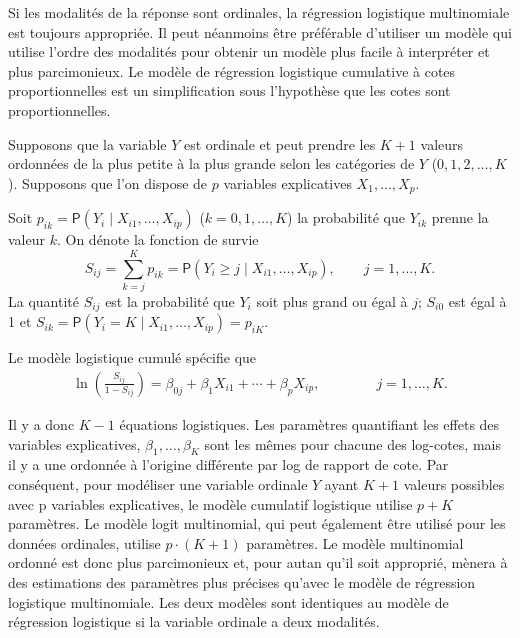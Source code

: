 \documentclass[
  11pt,
  letterpaper,
]{book}
\theoremstyle{definition}
\theoremstyle{definition}
\theoremstyle{definition}
\theoremstyle{remark}
\begin{document}
Si les modalités de la réponse sont ordinales, la régression logistique multinomiale est toujours appropriée. Il peut néanmoins être préférable d'utiliser un modèle qui utilise l'ordre des modalités pour obtenir un modèle plus facile à interpréter et plus parcimonieux. Le modèle de régression logistique cumulative à cotes proportionnelles est un simplification sous l'hypothèse que les cotes sont proportionnelles.

Supposons que la variable \(Y\) est ordinale et peut prendre les \(K+1\) valeurs ordonnées de la plus petite à la plus grande selon les catégories de \(Y\) (\(0, 1, 2, \ldots, K\)). Supposons que l'on dispose de \(p\) variables explicatives \(X_1, \ldots, X_p\).

Soit \(p_{ik}={\mathsf P}\left(Y_i \mid X_{i1}, \ldots, X_{ip}\right)\) (\(k=0, 1, \ldots, K\)) la probabilité que \(Y_{ik}\) prenne la valeur \(k\). On dénote la fonction de survie
\[S_{ij}=\sum_{k=j}^K p_{ik}= {\mathsf P}\left(Y_{i} \geq j\mid X_{i1}, \ldots, X_{ip}\right), \qquad j=1, \ldots, K.
\]
La quantité \(S_{ij}\) est la probabilité que \(Y_i\) soit plus grand ou égal à \(j\); \(S_{i0}\) est égal à 1 et \(S_{ik} = {\mathsf P}\left(Y_i=K \mid X_{i1}, \ldots, X_{ip}\right)=p_{iK}\).

Le modèle logistique cumulé spécifie que
\begin{align*}
\ln \left( \frac{S_{ij}}{1-S_{ij}}\right) = \beta_{0j} + \beta_1 X_{i1} + \cdots + \beta_p X_{ip}, \qquad \qquad  j=1, \ldots, K.
\end{align*}

Il y a donc \(K-1\) équations logistiques. Les paramètres quantifiant les effets des variables explicatives, \(\beta_1, \ldots, \beta_K\) sont les mêmes pour chacune des log-cotes, mais il y a une ordonnée à l'origine différente par log de rapport de cote. Par conséquent, pour modéliser une variable ordinale \(Y\) ayant \(K+1\) valeurs possibles avec p variables explicatives, le modèle cumulatif logistique utilise \(p + K\) paramètres. Le modèle logit multinomial, qui peut également être utilisé pour les données ordinales, utilise \(p\cdot (K+1)\) paramètres. Le modèle multinomial ordonné est donc plus parcimonieux et, pour autan qu'il soit approprié, mènera à des estimations des paramètres plus précises qu'avec le modèle de régression logistique multinomiale. Les deux modèles sont identiques au modèle de régression logistique si la variable ordinale a deux modalités.
\end{document}
